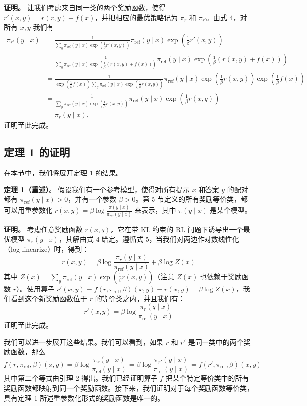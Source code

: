 \documentclass[11pt,UTF8,fontset=fandol]{ctexart}
\newcommand{\sref}{\mathrm{ref}}
\begin{document}
\textbf{证明。} 让我们考虑来自同一类的两个奖励函数，使得 $r'(x, y) = r(x, y) + f(x)$，并把相应的最优策略记为 $\pi_r$ 和 $\pi_{r'}$。由式 4，对所有 $x, y$ 我们有
\[
\begin{aligned}
\pi_{r'}(y \mid x) &= \frac{1}{\sum_y \pi_\sref(y \mid x) \exp\left(\frac{1}{\beta} r'(x, y)\right)} \pi_\sref(y \mid x) \exp\left(\frac{1}{\beta} r'(x, y)\right) \\
&= \frac{1}{\sum_y \pi_\sref(y \mid x) \exp\left(\frac{1}{\beta} (r(x, y) + f(x))\right)} \pi_\sref(y \mid x) \exp\left(\frac{1}{\beta} (r(x, y) + f(x))\right) \\
&= \frac{1}{\exp\left(\frac{1}{\beta} f(x)\right) \sum_y \pi_\sref(y \mid x) \exp\left(\frac{1}{\beta} r(x, y)\right)} \pi_\sref(y \mid x) \exp\left(\frac{1}{\beta} r(x, y)\right) \exp\left(\frac{1}{\beta} f(x)\right) \\
&= \frac{1}{\sum_y \pi_\sref(y \mid x) \exp\left(\frac{1}{\beta} r(x, y)\right)} \pi_\sref(y \mid x) \exp\left(\frac{1}{\beta} r(x, y)\right) \\
&= \pi_r(y \mid x),
\end{aligned}
\]
证明至此完成。

\subsection{定理 1 的证明}

在本节中，我们将展开定理 1 的结果。

\textbf{定理 1（重述）。} 假设我们有一个参考模型，使得对所有提示 $x$ 和答案 $y$ 的配对都有 $\pi_\sref(y \mid x) > 0$，并有一个参数 $\beta > 0$。第 5 节定义的所有奖励等价类，都可以用重参数化 $r(x, y) = \beta \log \frac{\pi(y \mid x)}{\pi_\sref(y \mid x)}$ 来表示，其中 $\pi(y \mid x)$ 是某个模型。

\textbf{证明。} 考虑任意奖励函数 $r(x, y)$，它在带 KL 约束的 RL 问题下诱导出一个最优模型 $\pi_r(y \mid x)$，其解由式 4 给定。遵循式 5，当我们对两边作对数线性化（log-linearize）时，得到：
\[
r(x, y) = \beta \log \frac{\pi_r(y \mid x)}{\pi_\sref(y \mid x)} + \beta \log Z(x)
\]
其中 $Z(x) = \sum_y \pi_\sref(y \mid x) \exp\left(\frac{1}{\beta} r(x, y)\right)$（注意 $Z(x)$ 也依赖于奖励函数 $r$）。使用算子 $r'(x, y) = f(r, \pi_\sref, \beta)(x, y) = r(x, y) - \beta \log Z(x)$，我们看到这个新奖励函数位于 $r$ 的等价类之内，并且我们有：
\[
r'(x, y) = \beta \log \frac{\pi_r(y \mid x)}{\pi_\sref(y \mid x)}
\]
证明至此完成。

我们可以进一步展开这些结果。我们可以看到，如果 $r$ 和 $r'$ 是同一类中的两个奖励函数，那么
\[
f(r, \pi_\sref, \beta)(x, y) = \beta \log \frac{\pi_r(y \mid x)}{\pi_\sref(y \mid x)} = \beta \log \frac{\pi_{r'}(y \mid x)}{\pi_\sref(y \mid x)} = f(r', \pi_\sref, \beta)(x, y)
\]
其中第二个等式由引理 2 得出。我们已经证明算子 $f$ 把某个特定等价类中的所有奖励函数都映射到同一个奖励函数。接下来，我们证明对于每个奖励函数等价类，具有定理 1 所述重参数化形式的奖励函数是唯一的。
\end{document}
